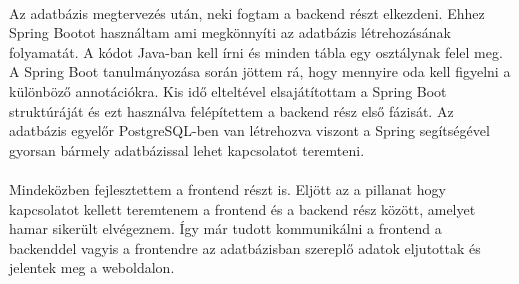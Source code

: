 \documentclass{article}
\begin{document}
	\paragraph{}
	Az adatbázis megtervezés után, neki fogtam a backend részt elkezdeni. Ehhez Spring Bootot használtam ami megkönnyíti az adatbázis létrehozásának folyamatát. A kódot Java-ban kell írni és minden tábla egy osztálynak felel meg. A Spring Boot tanulmányozása során jöttem rá, hogy mennyire oda kell figyelni a különböző annotációkra. Kis idő elteltével elsajátítottam a Spring Boot struktúráját és ezt használva felépítettem a backend rész első fázisát. Az adatbázis egyelőr PostgreSQL-ben van létrehozva viszont a Spring segítségével gyorsan bármely adatbázissal lehet kapcsolatot teremteni.
	\paragraph{}
	Mindeközben fejlesztettem a frontend részt is. Eljött az a pillanat hogy kapcsolatot kellett teremtenem a frontend és a backend rész között, amelyet hamar sikerült elvégeznem. Így már tudott kommunikálni a frontend a backenddel vagyis a frontendre az adatbázisban szereplő adatok eljutottak és jelentek meg a weboldalon. 
\end{document}
